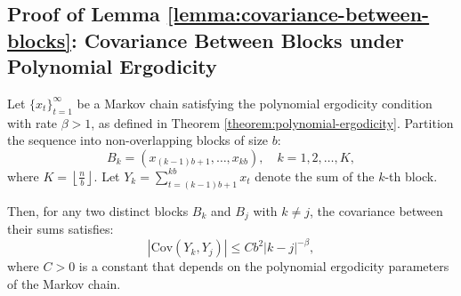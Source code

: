 \subsection{Proof of Lemma \ref{lemma:covariance-between-blocks}: Covariance Between Blocks under Polynomial Ergodicity}
\label{app:proof-covariance-between-blocks}

\begin{lemmaapp*}
Let \(\{x_t\}_{t=1}^\infty\) be a Markov chain satisfying the polynomial ergodicity condition with rate \(\beta > 1\), as defined in Theorem \ref{theorem:polynomial-ergodicity}. Partition the sequence into non-overlapping blocks of size \(b\):
\[
B_k = (x_{(k-1)b + 1}, \ldots, x_{kb}), \quad k = 1, 2, \ldots, K,
\]
where \(K = \left\lfloor \frac{n}{b} \right\rfloor\). Let \(Y_k = \sum_{t=(k-1)b + 1}^{kb} x_t\) denote the sum of the \(k\)-th block.

Then, for any two distinct blocks \(B_k\) and \(B_j\) with \(k \neq j\), the covariance between their sums satisfies:
\[
|\text{Cov}(Y_k, Y_j)| \leq C b^2 |k - j|^{-\beta},
\]
where \(C > 0\) is a constant that depends on the polynomial ergodicity parameters of the Markov chain.
\end{lemmaapp*}

